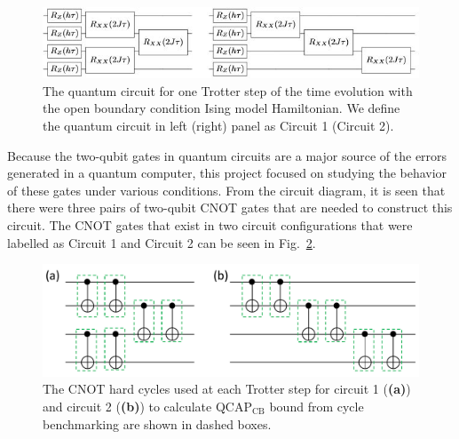 \begin{figure}[!tb]
\includegraphics[width=\textwidth]{Circuits1.JPG}
\caption{The quantum circuit for one Trotter step of the time evolution with the open boundary condition Ising model Hamiltonian. We define the quantum circuit in left (right) panel as Circuit 1 (Circuit 2).}
\label{fig:IsingTrotterCircs}
\end{figure}


Because the two-qubit gates in quantum circuits are a major source of the errors generated in a quantum computer, this project focused on studying the behavior of these gates under various conditions. From the circuit diagram, it is seen that there were three pairs of two-qubit CNOT gates that are needed to construct this circuit. The CNOT gates that exist in two circuit configurations that were labelled as Circuit 1 and Circuit 2 can be seen in Fig.~\ref{fig:hardcycles}.

\begin{figure}[htpb]
    \includegraphics[scale=0.50]{hardcyclesCirc1Circ2.pdf}
    \caption{The CNOT hard cycles used at each Trotter step for circuit 1 ({\bf{(a)}}) and circuit 2 ({\bf{(b)}}) to calculate QCAP$_{\text{CB}}$ bound from cycle benchmarking are shown in dashed boxes.}
    \label{fig:hardcycles}
\end{figure}


